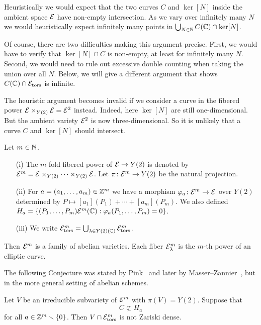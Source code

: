 \begin{example}
  Heuristically we would expect that the two curves $C$ and $\ker[N]$
  inside the ambient space ${\mathcal E}$ have non-empty intersection. As we
  vary over infinitely many $N$ we would heuristically expect
  infinitely many points in $\bigcup_{N\in{\mathbb{N}}}C({\mathbb{C}})\cap \ker[N]$.

  Of course, there are two difficulties making this  argument precise.
  First, we would have to verify that $\ker[N]\cap C$ is non-empty, at
  least for infinitely many $N$. Second, we would need to rule out
  excessive double counting when taking the union over all $N$. Below,
  we
  will give a different argument that shows $C({\mathbb{C}})\cap{\mathcal E}_{\mathrm{tors}}$
  is infinite.

  The heuristic argument becomes invalid if we consider a curve in the
  fibered power ${\mathcal E}\times_{Y(2)} {\mathcal E} ={\mathcal E}^2$ instead. Indeed, here $\ker[N]$
  are still one-dimensional. But the ambient variety ${\mathcal E}^2$ is now
  three-dimensional. So it is unlikely that a curve $C$ and $\ker[N]$
  should intersect.
\end{example}

\begin{definition}  Let $m\in{\mathbb{N}}$.
  \begin{enumerate}
  \item [(i)] The $m$-fold fibered power of ${\mathcal E}\rightarrow Y(2)$
    is denoted by ${\mathcal E}^m = {\mathcal E}\times_{Y(2)}\cdots\times_{Y(2)}{\mathcal E}$.
    Let $\pi\colon{\mathcal E}^m\rightarrow Y(2)$ be the natural projection.
  \item[(ii)] For $a=(a_1,\ldots,a_m)\in{\mathbb{Z}}^m$ we have a morphism
    $\varphi_a \colon {\mathcal E}^m\rightarrow {\mathcal E}$ over $Y(2)$
    determined  by $P\mapsto
    [a_1](P_1)+\cdots +[a_m](P_m)$. We also defined $H_a =
    \{(P_1,\ldots,P_m) {\mathcal E}^m({\mathbb{C}}) : \varphi_a(P_1,\ldots,P_m)=0\}$. 
  \item[(iii)]  We write ${\mathcal E}^m_{\mathrm{tors}} = \bigcup_{\lambda\in Y(2)({\mathbb{C}})}
    {\mathcal E}^m_{\mathrm{tors}}$. 
  \end{enumerate}
\end{definition}

Then ${\mathcal E}^m$ is a family of abelian varieties. Each fiber
${\mathcal E}^m_\lambda$ is the $m$-th power of an elliptic curve.

The following Conjecture was stated by Pink~\cite{Pink} and later by
Masser--Zannier~\cite{MZ:AJM10}, but in the more general setting of
abelian schemes.

\begin{conjecture}
  \label{conj:relmmEm}
  Let $V$ be an irreducible subvariety of ${\mathcal E}^m$ with $\pi(V)=Y(2)$.
  Suppose that  
  \begin{equation*}
    C\not\subset H_a
  \end{equation*}
  for all $a\in{\mathbb{Z}}^{m}\smallsetminus\{0\}$.
  Then $V\cap {\mathcal E}^m_{\mathrm{tors}}$ is not Zariski dense.
\end{conjecture}



